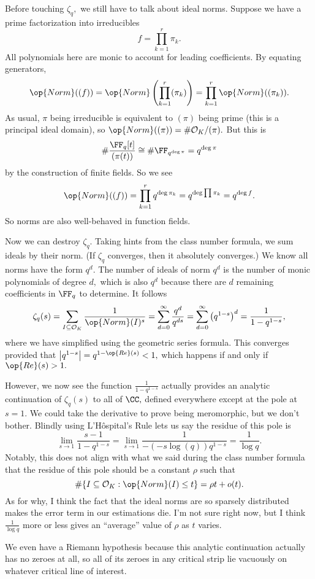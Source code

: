 Before touching $\zeta_q,$ we still have to talk about ideal norms. Suppose we have a prime factorization into irreducibles
\[f=\prod_{k=1}^r\pi_k.\]
All polynomials here are monic to account for leading coefficients. By equating generators,
\[\op{Norm}((f))=\op{Norm}\left(\prod_{k=1}^r(\pi_k)\right)=\prod_{k=1}^r\op{Norm}((\pi_k)).\]
As usual, $\pi$ being irreducible is equivalent to $(\pi)$ being prime (this is a principal ideal domain), so $\op{Norm}((\pi))=\#\mathcal O_K/(\pi).$ But this is
\[\#\frac{\FF_q[t]}{(\pi(t))}\cong\#\FF_{q^{\deg\pi}}=q^{\deg\pi}\]
by the construction of finite fields. So we see
\[\op{Norm}((f))=\prod_{k=1}^rq^{\deg\pi_k}=q^{\deg\prod\pi_k}=q^{\deg f}.\]
So norms are also well-behaved in function fields.

Now we can destroy $\zeta_q.$ Taking hints from the class number formula, we sum ideals by their norm. (If $\zeta_q$ converges, then it absolutely converges.) We know all norms have the form $q^d.$ The number of ideals of norm $q^d$ is the number of monic polynomials of degree $d,$ which is also $q^d$ because there are $d$ remaining coefficients in $\FF_q$ to determine. It follows
\[\zeta_q(s)=\sum_{I\subseteq\mathcal O_K}\frac1{\op{Norm}(I)^s}=\sum_{d=0}^\infty\frac{q^d}{q^{ds}}=\sum_{d=0}^\infty\left(q^{1-s}\right)^d=\frac1{1-q^{1-s}},\]
where we have simplified using the geometric series formula. This converges provided that $\left|q^{1-s}\right|=q^{1-\op{Re}(s)}<1,$ which happens if and only if $\op{Re}(s)>1.$

However, we now see the function $\frac1{1-q^{1-s}}$ actually provides an analytic continuation of $\zeta_q(s)$ to all of $\CC,$ defined everywhere except at the pole at $s=1.$ We could take the derivative to prove being meromorphic, but we don't bother. Blindly using L'H\^ospital's Rule lets us say the residue of this pole is
\[\lim_{s\to1}\frac{s-1}{1-q^{1-s}}=\lim_{s\to1}\frac1{-(-s\log(q))q^{1-s}}=\frac1{\log q}.\]
Notably, this does not align with what we said during the class number formula that the residue of this pole should be a constant $\rho$ such that
\[\#\{I\subseteq\mathcal O_K:\op{Norm}(I)\le t\}=\rho t+o(t).\]
As for why, I think the fact that the ideal norms are so sparsely distributed makes the error term in our estimations die. I'm not sure right now, but I think $\frac1{\log q}$ more or less gives an ``average'' value of $\rho$ as $t$ varies.

We even have a Riemann hypothesis because this analytic continuation actually has no zeroes at all, so all of its zeroes in any critical strip lie vacuously on whatever critical line of interest.


